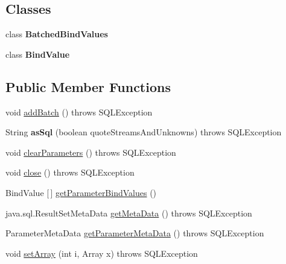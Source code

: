 \subsection*{Classes}
\begin{DoxyCompactItemize}
\item 
class {\bfseries Batched\+Bind\+Values}
\item 
class {\bfseries Bind\+Value}
\end{DoxyCompactItemize}
\subsection*{Public Member Functions}
\begin{DoxyCompactItemize}
\item 
void \mbox{\hyperlink{classcom_1_1mysql_1_1jdbc_1_1_server_prepared_statement_a433afad2cb519d3cfcab97083295d1ce}{add\+Batch}} ()  throws S\+Q\+L\+Exception 
\item 
\mbox{\label{classcom_1_1mysql_1_1jdbc_1_1_server_prepared_statement_af8e1bd92128efc0345ce627db3d5bc8b}} 
String {\bfseries as\+Sql} (boolean quote\+Streams\+And\+Unknowns)  throws S\+Q\+L\+Exception 
\item 
void \mbox{\hyperlink{classcom_1_1mysql_1_1jdbc_1_1_server_prepared_statement_a7c1e2ab709b4d6734375679c471a2c9d}{clear\+Parameters}} ()  throws S\+Q\+L\+Exception 
\item 
void \mbox{\hyperlink{classcom_1_1mysql_1_1jdbc_1_1_server_prepared_statement_a2d447ecd02f6f318e320d5c33ebfa780}{close}} ()  throws S\+Q\+L\+Exception 
\item 
Bind\+Value \mbox{[}$\,$\mbox{]} \mbox{\hyperlink{classcom_1_1mysql_1_1jdbc_1_1_server_prepared_statement_ac3e44f38c9fda53e8bb3d2e604298460}{get\+Parameter\+Bind\+Values}} ()
\item 
java.\+sql.\+Result\+Set\+Meta\+Data \mbox{\hyperlink{classcom_1_1mysql_1_1jdbc_1_1_server_prepared_statement_a85e380906b8d5a39f8c0aaee48d1a587}{get\+Meta\+Data}} ()  throws S\+Q\+L\+Exception 
\item 
Parameter\+Meta\+Data \mbox{\hyperlink{classcom_1_1mysql_1_1jdbc_1_1_server_prepared_statement_afdd67ceeee80fb2e90fbe6ce94502267}{get\+Parameter\+Meta\+Data}} ()  throws S\+Q\+L\+Exception 
\item 
void \mbox{\hyperlink{classcom_1_1mysql_1_1jdbc_1_1_server_prepared_statement_a5b7edfa5f5447b3ff8d511f524021031}{set\+Array}} (int i, Array x)  throws S\+Q\+L\+Exception 

\end{DoxyCompactItemize}
